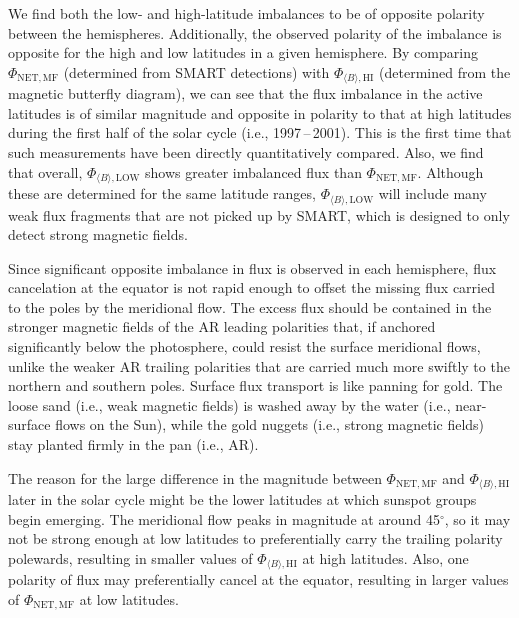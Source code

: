 \documentclass[namedreferences]{solarphysics}
\newcommand{\degr}{\ensuremath{^\circ}}
\begin{document}
\begin{article}
We find both the low- and high-latitude imbalances to be of opposite polarity between  the hemispheres. Additionally, the observed polarity of the imbalance is opposite for the high and low latitudes in a given hemisphere. By comparing $\Phi_{\mathrm{NET,MF}}$ (determined from SMART detections)
with $\Phi_{\langle B \rangle,\mathrm{HI}}$ (determined from the magnetic butterfly diagram), we can see that the flux imbalance in the active latitudes is of similar magnitude and opposite in polarity to that at high latitudes during the first half of the solar cycle (i.e., 1997\,--\,2001). This is the first time that such measurements have been directly quantitatively compared. Also, we find that overall, $\Phi_{\langle B \rangle,\mathrm{LOW}}$ shows greater imbalanced flux than $\Phi_{\mathrm{NET,MF}}$. Although these are determined for the same latitude ranges, $\Phi_{\langle B \rangle,\mathrm{LOW}}$ will include many weak flux fragments that are not picked up by SMART, which is designed to only detect strong magnetic fields.

Since significant opposite imbalance in flux is observed in each hemisphere, flux cancelation at the equator is not rapid enough to offset the missing flux carried to the poles by the meridional flow. 
The excess flux should be contained in the stronger magnetic fields of the AR leading polarities that, if anchored significantly below the photosphere, could resist the surface meridional flows, unlike the weaker AR trailing polarities that are carried much more swiftly to the northern and southern poles. Surface flux transport is like panning for gold. The loose sand (i.e., weak magnetic fields) is washed away by the water (i.e., near-surface flows on the Sun), while the gold nuggets (i.e., strong magnetic fields) stay planted firmly in the pan (i.e., AR).

The reason for the large difference in the magnitude between $\Phi_{\mathrm{NET,MF}}$ and $\Phi_{\langle B \rangle,\mathrm{HI}}$ later in the solar cycle might be the lower latitudes at which sunspot groups begin emerging. The meridional flow peaks in magnitude at around 45\degr, so it may not be strong enough at low latitudes to preferentially carry the trailing polarity polewards, resulting in smaller values of $\Phi_{\langle B \rangle,\mathrm{HI}}$ at high latitudes. Also, one polarity of flux may preferentially cancel at the equator, resulting in larger values of $\Phi_{\mathrm{NET,MF}}$ at low latitudes.


\end{article}
\end{document}
